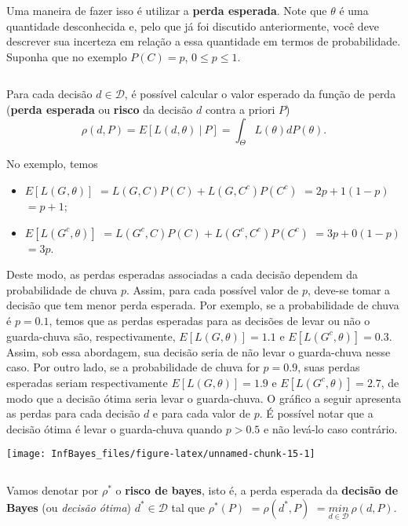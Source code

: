 \documentclass[
]{book}
\begin{document}
Uma maneira de fazer isso é utilizar a \textbf{perda esperada}. Note que \(\theta\) é uma quantidade desconhecida e, pelo que já foi discutido anteriormente, você deve descrever sua incerteza em relação a essa quantidade em termos de probabilidade. Suponha que no exemplo \(P(C)=p\), \(0\leq p\leq 1\).

\(~\)

Para cada decisão \(d \in \mathcal{D}\), é possível calcular o valor esperado da função de perda (\textbf{perda esperada} ou \textbf{risco} da decisão \(d\) contra a priori \(P\))
\[\rho(d,P) = E\left[L(d,\theta) ~|~ P\right] = \int_{\Theta} L(\theta) dP(\theta).\]
\(~\)

No exemplo, temos

\begin{itemize}
\item
  \(E\left[L(G^{},\theta)\right]\) \(=L(G,C)P(C) + L(G,C^c)P(C^c)\) \(=2p+1(1-p)\) \(=p+1\);
\item
  \(E\left[L(G^c,\theta)\right]\) \(=L(G^c,C)P(C) + L(G^c,C^c)P(C^c)\) \(=3p+0(1-p)\) \(=3p\).
\end{itemize}

Deste modo, as perdas esperadas associadas a cada decisão dependem da probabilidade de chuva \(p\). Assim, para cada possível valor de \(p\), deve-se tomar a decisão que tem menor perda esperada. Por exemplo, se a probabilidade de chuva é \(p=0.1\), temos que as perdas esperadas para as decisões de levar ou não o guarda-chuva são, respectivamente, \(E\left[L(G,\theta)\right]=1.1\) e \(E\left[L(G^c,\theta)\right]=0.3\). Assim, sob essa abordagem, sua decisão seria de não levar o guarda-chuva nesse caso. Por outro lado, se a probabilidade de chuva for \(p=0.9\), suas perdas esperadas seriam respectivamente \(E\left[L(G,\theta)\right]=1.9\) e \(E\left[L(G^c,\theta)\right]=2.7\), de modo que a decisão ótima seria levar o guarda-chuva. O gráfico a seguir apresenta as perdas para cada decisão \(d\) e para cada valor de \(p\). É possível notar que a decisão ótima é levar o guarda-chuva quando \(p>0.5\) e não levá-lo caso contrário.

\begin{center}\texttt{[image: InfBayes\_files/figure-latex/unnamed-chunk-15-1]} \end{center}

\(~\)

Vamos denotar por \(\rho^*\) o \textbf{risco de bayes}, isto é, a perda esperada da \textbf{decisão de Bayes} (ou \emph{decisão ótima}) \(d^*\in \mathcal{D}\) tal que \(\rho^*(P)\) \(=\rho(d^*,P)\) \(=\underset{d\in\mathcal{D}}{min}~\rho(d,P)\).
\end{document}
